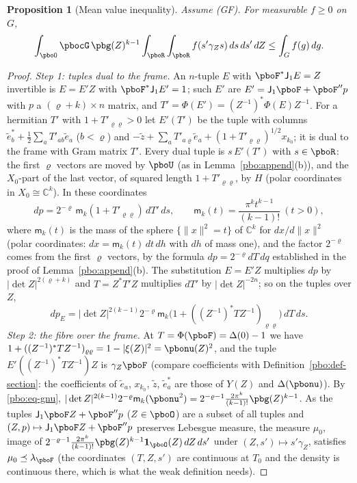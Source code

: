 \documentclass[10pt]{amsart}
\newtheorem{proposition}[theorem]{Proposition}
\theoremstyle{definition}
\theoremstyle{remark}
\newcommand{\C}{\mathbb C}
\begin{document}
\begin{proposition}[Mean value inequality]\label{pbo:meanvalue}
Assume \textup{(GF)}. For measurable $f\ge0$ on $G$,
\[
\int_{\pboO}\pbocG\,\pbg(Z)^{k-1}\int_{\pboR}\int_{\pboR}f(s'\gamma_Zs)\,ds\,ds'\,dZ\le\int_Gf(g)\,dg .
\]
\end{proposition}
\begin{proof}
\emph{Step 1: tuples dual to the frame.} An $n$-tuple $E$ with $\pboF^*\mathsf J_1E=Z$ invertible is
$E=E'Z$ with $\pboF^*\mathsf J_1E'=1$; such $E'$ are $E'=\mathsf J_1\pboF+\pboF''p$ with $p$ a
$(\varrho+k)\times n$ matrix, and $T'=\Phi(E')=(Z^{-1})^*\Phi(E)Z^{-1}$. For a hermitian $T'$ with
$1+T'_{\varrho\varrho}>0$ let $E'(T')$ be the tuple with columns $\tilde e^*_b+\frac12\sum_aT'_{ab}\tilde
e_a$ ($b<\varrho$) and $-\tilde z+\sum_aT'_{a\varrho}\tilde e_a+(1+T'_{\varrho\varrho})^{1/2}x_{k_0}$; it is dual
to the frame with Gram matrix $T'$. Every dual tuple is $s\,E'(T')$ with $s\in\pboR$: the first $\varrho$
vectors are moved by $\pboU$ (as in Lemma~\ref{pbo:append}(b)), and the $X_0$-part of the last vector,
of squared length $1+T'_{\varrho\varrho}$, by $H$ (polar coordinates in $X_0\cong\C^k$). In these
coordinates
\begin{equation}\label{pbo:eq-dual}
dp=2^{-\varrho}\,\mathsf m_k(1+T'_{\varrho\varrho})\,dT'\,ds,\qquad\mathsf m_k(t)=\frac{\pi^kt^{k-1}}{(k-1)!}
\ (t>0),
\end{equation}
where $\mathsf m_k(t)$ is the mass of the sphere $\{\|x\|^2=t\}$ of $\C^k$ for $dx/d\|x\|^2$ (polar
coordinates: $dx=\mathsf m_k(t)\,dt\,dh$ with $dh$ of mass one), and the factor $2^{-\varrho}$ comes from
the first $\varrho$ vectors, by the formula $dp=2^{-\varrho}dT\,dq$ established in the proof of Lemma~\ref{pbo:append}(b). The substitution $E=E'Z$ multiplies $dp$ by $|\det Z|^{2(\varrho+k)}$ and
$T=Z^*T'Z$ multiplies $dT'$ by $|\det Z|^{-2n}$; so on the tuples over $Z$,
\[
dp_E=|\det Z|^{2(k-1)}2^{-\varrho}\mathsf m_k\bigl(1+((Z^{-1})^*TZ^{-1})_{\varrho\varrho}\bigr)\,dT\,ds .
\]
\emph{Step 2: the fibre over the frame.} At $T=\Phi(\pboF)=\Delta(0)-1$ we have $1+((Z^{-1})^*T Z^{-1})_{
\varrho\varrho}=1-|\xi(Z)|^2=\pbonu(Z)^2$, and the tuple $E'((Z^{-1})^*TZ^{-1})Z$ is $\gamma_Z\pboF$ (compare
coefficients with Definition~\ref{pbo:def-section}: the coefficients of $\tilde e_a$, $x_{k_0}$, $\tilde
z$, $\tilde e^*_a$ are those of $Y(Z)$ and $\Delta(\pbonu)$). By \eqref{pbo:eq-gnu},
$|\det Z|^{2(k-1)}2^{-\varrho}\mathsf m_k(\pbonu^2)=2^{-\varrho-1}\frac{2\pi^k}{(k-1)!}\pbg(Z)^{k-1}$. As the
tuples $\mathsf J_1\pboF Z+\pboF''p$ ($Z\in\pboO$) are a subset of all tuples and $(Z,p)\mapsto\mathsf J_1
\pboF Z+\pboF''p$ preserves Lebesgue measure, the measure $\mu_0$, image of $2^{-\varrho-1}\frac{2\pi^k}{(
k-1)!}\pbg(Z)^{k-1}\mathbf 1_{\pboO}(Z)\,dZ\,ds'$ under $(Z,s')\mapsto s'\gamma_Z$, satisfies $\mu_0\preceq
\lambda_{\pboF}$ (the coordinates $(T,Z,s')$ are continuous at $T_0$ and the density is continuous
there, which is what the weak definition needs).


\end{proof}
\end{document}

